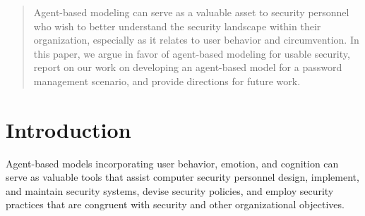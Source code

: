 \documentclass[conference]{IEEEtran}
\begin{document}




\maketitle


\begin{abstract}
Agent-based modeling can serve as a valuable asset to security
personnel who wish to better understand the security landscape within
their organization, especially as it relates to user behavior and
circumvention. In this paper, we argue in favor of agent-based
modeling for usable security, report on our work on developing an
agent-based model for a password management scenario, and provide
directions for future work.
\end{abstract}





%
\IEEEpeerreviewmaketitle

\newcommand{\dash}{{\sc dash}}

\section{Introduction}
\label{Introduction}

Agent-based models incorporating user behavior, emotion, and 
cognition can serve as valuable tools that assist computer security 
personnel design, implement, and maintain security systems, 
devise security policies, and employ security practices that 
are congruent with security and other organizational objectives.
\end{document}
